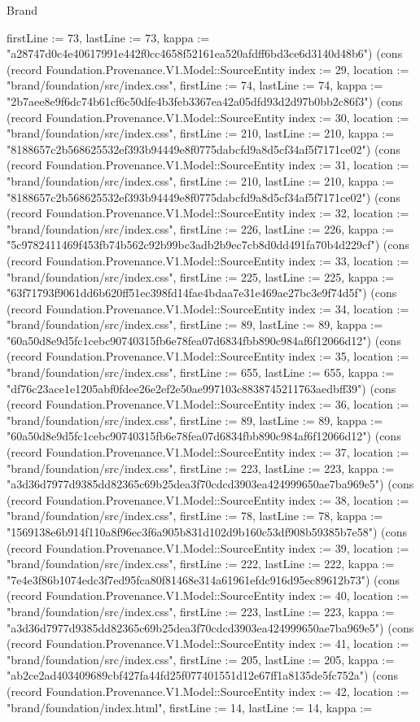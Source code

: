 \begin{lexlean}{Brand}
\begin{semanticmodule}
{firstLine := 73, lastLine := 73, kappa := "a28747d0c4e40617991e442f0cc4658f52161ea520afdff6bd3ce6d3140d48b6"}) (cons (record Foundation.Provenance.V1.Model::SourceEntity {index := 29, location := "brand/foundation/src/index.css", firstLine := 74, lastLine := 74, kappa := "2b7aee8e9f6dc74b61cf6c50dfe4b3feb3367ea42a05dfd93d2d97b0bb2c86f3"}) (cons (record Foundation.Provenance.V1.Model::SourceEntity {index := 30, location := "brand/foundation/src/index.css", firstLine := 210, lastLine := 210, kappa := "8188657c2b568625532ef393b94449e8f0775dabcfd9a8d5cf34af5f7171ce02"}) (cons (record Foundation.Provenance.V1.Model::SourceEntity {index := 31, location := "brand/foundation/src/index.css", firstLine := 210, lastLine := 210, kappa := "8188657c2b568625532ef393b94449e8f0775dabcfd9a8d5cf34af5f7171ce02"}) (cons (record Foundation.Provenance.V1.Model::SourceEntity {index := 32, location := "brand/foundation/src/index.css", firstLine := 226, lastLine := 226, kappa := "5c9782411469f453fb74b562c92b99bc3adb2b9ec7cb8d0dd491fa70b4d229cf"}) (cons (record Foundation.Provenance.V1.Model::SourceEntity {index := 33, location := "brand/foundation/src/index.css", firstLine := 225, lastLine := 225, kappa := "63f71793f9061dd6b620ff51ec398fd14fae4bdaa7e31e469ae27bc3e9f74d5f"}) (cons (record Foundation.Provenance.V1.Model::SourceEntity {index := 34, location := "brand/foundation/src/index.css", firstLine := 89, lastLine := 89, kappa := "60a50d8e9d5fc1cebc90740315fb6e78fea07d6834fbb890c984af6f12066d12"}) (cons (record Foundation.Provenance.V1.Model::SourceEntity {index := 35, location := "brand/foundation/src/index.css", firstLine := 655, lastLine := 655, kappa := "df76c23ace1e1205abf0fdee26e2ef2e50ae997103c8838745211763aedbff39"}) (cons (record Foundation.Provenance.V1.Model::SourceEntity {index := 36, location := "brand/foundation/src/index.css", firstLine := 89, lastLine := 89, kappa := "60a50d8e9d5fc1cebc90740315fb6e78fea07d6834fbb890c984af6f12066d12"}) (cons (record Foundation.Provenance.V1.Model::SourceEntity {index := 37, location := "brand/foundation/src/index.css", firstLine := 223, lastLine := 223, kappa := "a3d36d7977d9385dd82365c69b25dea3f70cdcd3903ea424999650ae7ba969e5"}) (cons (record Foundation.Provenance.V1.Model::SourceEntity {index := 38, location := "brand/foundation/src/index.css", firstLine := 78, lastLine := 78, kappa := "1569138e6b914f110a8f96ec3f6a905b831d102d9b160c53df908b59385b7e58"}) (cons (record Foundation.Provenance.V1.Model::SourceEntity {index := 39, location := "brand/foundation/src/index.css", firstLine := 222, lastLine := 222, kappa := "7e4e3f86b1074edc3f7ed95fca80f81468e314a61961efdc916d95ec89612b73"}) (cons (record Foundation.Provenance.V1.Model::SourceEntity {index := 40, location := "brand/foundation/src/index.css", firstLine := 223, lastLine := 223, kappa := "a3d36d7977d9385dd82365c69b25dea3f70cdcd3903ea424999650ae7ba969e5"}) (cons (record Foundation.Provenance.V1.Model::SourceEntity {index := 41, location := "brand/foundation/src/index.css", firstLine := 205, lastLine := 205, kappa := "ab2ce2ad403409689cbf427fa44fd25f077401551d12e67ff1a8135de5fc752a"}) (cons (record Foundation.Provenance.V1.Model::SourceEntity {index := 42, location := "brand/foundation/index.html", firstLine := 14, lastLine := 14, kappa := }
\end{semanticmodule}
\end{lexlean}
